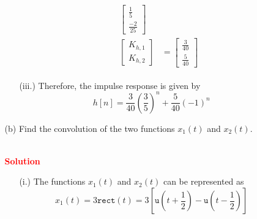 \documentclass[a4paper, 12pt]{article}
\begin{document}
\begin{itemize}
\begin{itemize}
\begin{itemize}
\begin{itemize}
\begin{center}
\begin{equation}
\begin{gathered}
\begin{alignedat}{1}
\begin{bmatrix}
\frac{1}{5} \\
\frac{-2}{25}
\end{bmatrix} \\
\begin{bmatrix}
K_{h, 1} \\
K_{h, 2}
\end{bmatrix} &=
\begin{bmatrix}
\frac{3}{40} \\
\frac{5}{40}
\end{bmatrix}
\end{alignedat}
\end{gathered}
\end{equation}
\end{center}
\end{itemize}
\item[(iii.)]{Therefore, the impulse response is given by}
\begin{equation}
\boxed{h[n] = \frac{3}{40} \left(\frac{3}{5} \right)^{n} + \frac{5}{40} \left(-1 \right)^{n}}
\end{equation}
\end{itemize}

\pagebreak
\item[(b)]{Find the convolution of the two functions $x_{1}(t)$ and $x_{2}(t)$.}
\begin{figure}[h!]
\end{figure} \\
\textcolor{red}{\textbf{Solution}}
\begin{itemize}
\item[(i.)]{The functions $x_{1}(t)$ and $x_{2}(t)$ can be represented as}
\begin{equation}
x_{1}(t) = 3\mathtt{rect}(t) = 3 \left[ \mathtt{u}\left(t + \frac{1}{2}\right) - \mathtt{u}\left(t - \frac{1}{2}\right)\right]
\end{equation}


\end{itemize}
\end{itemize}
\end{itemize}
\end{document}
